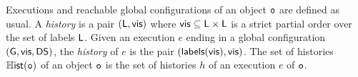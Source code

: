 Executions and reachable global configurations of an object $\mathtt{o}$
are defined as usual.
A \emph{history} is a pair $(\mathsf{L},\mathsf{vis})$ where
$\mathsf{vis}\subseteq \mathsf{L}\times\mathsf{L}$ is a strict partial
order over the set of labels $\mathsf{L}$.
Given an execution $e$ ending in a global configuration $(\mathsf{G},
\mathsf{vis}, \mathsf{DS})$, the \emph{history} of $e$ is the pair
$(\mathsf{labels}(\mathsf{vis}), \mathsf{vis})$.
The set of histories $\mathbb{H}\mathsf{ist}(\mathtt{o})$ of an object $\mathtt{o}$ is the
set of histories $h$ of an execution $e$ of $\mathtt{o}$.


%

%
%
%
%
%

